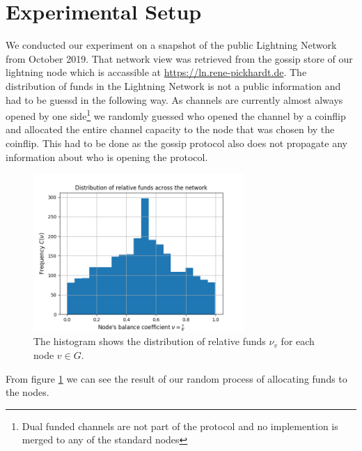 \documentclass[a4paper]{paper}
\begin{document}
\section{Experimental Setup}
\label{sec:setup}

We conducted our experiment on a snapshot of the public Lightning Network from October 2019.
That network view was retrieved from the gossip store of our lightning node which is accassible at \url{https://ln.rene-pickhardt.de}.
The distribution of funds in the Lightning Network is not a public information and had to be guessd in the following way.
As channels are currently almost always opened by one side\footnote{Dual funded channels are not part of the protocol and no implemention is merged to any of the standard nodes} we randomly guessed who opened the channel by a coinflip and allocated the entire channel capacity to the node that was chosen by the coinflip. 
This had to be done as the gossip protocol also does not propagate any information about who is opening the protocol.
\begin{figure}
 \centering
 \includegraphics[width=8cm]{code/vs/fig/distribution_of_nus.png}
 \caption{The histogram shows the distribution of relative funds $\nu_v$ for each node $v\in G$.}
 \label{fig:initial_funds}
\end{figure}
From figure \cref{fig:initial_funds} we can see the result of our random process of allocating funds to the nodes.
\end{document}

